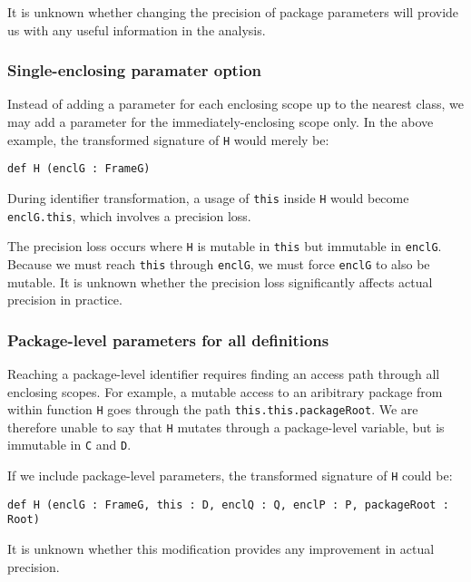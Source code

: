\documentclass[letterpaper,11pt]{article}
\newcommand{\code}[1]{\lstinline$#1$}
\begin{document}
It is unknown whether changing the precision of package parameters
will provide us with any useful information in the analysis.

\subsubsection{Single-enclosing paramater option}

Instead of adding a parameter for each enclosing scope up to the nearest class,
we may add a parameter for the immediately-enclosing scope only.
In the above example, the transformed signature of \code{H} would merely
be:
\begin{lstlisting}
def H (enclG : FrameG)
\end{lstlisting}
During identifier transformation, a usage of \code{this} inside \code{H}
would become \code{enclG.this}, which involves a precision loss.

The precision loss occurs where \code{H} is mutable in \code{this} but
immutable in \code{enclG}. Because we must reach \code{this} through
\code{enclG}, we must force \code{enclG} to also be mutable.
It is unknown whether the precision loss significantly affects actual precision in practice.

\subsubsection{Package-level parameters for all definitions}

Reaching a package-level identifier requires finding an access path through all enclosing scopes.
For example, a mutable access to an aribitrary package from within function \code{H}
goes through the path \mbox{\code{this.this.packageRoot}}.
We are therefore unable to say that \code{H} mutates through a package-level variable,
but is immutable in \code{C} and \code{D}.

If we include package-level parameters, the transformed signature of \code{H} could be:
\begin{lstlisting}
def H (enclG : FrameG, this : D, enclQ : Q, enclP : P, packageRoot : Root)
\end{lstlisting}
It is unknown whether this modification provides any improvement
in actual precision.




%
%
%
%
\end{document}
